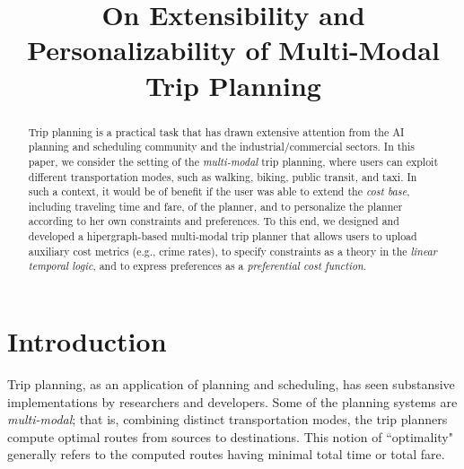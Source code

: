 \documentclass[letterpaper]{article}
\newcommand{\tit}[1]{\textit{#1}}
\begin{document}
%
\title{On Extensibility and Personalizability of Multi-Modal Trip Planning}
\maketitle
\begin{abstract}
	Trip planning is a practical task that has drawn
	extensive attention from the AI planning and scheduling community
	and the industrial/commercial sectors.
	In this paper, we consider the setting of the \tit{multi-modal}
	trip planning, where users can exploit different transportation
	modes, such as walking, biking, public transit, and taxi.
	In such a context, it would be of benefit if the
	user was able to extend the \tit{cost base}, including traveling time 
	and fare, of the planner, and to personalize the planner according
	to her own constraints and preferences.
	To this end, we designed and developed a hipergraph-based multi-modal
	trip planner that allows users to upload auxiliary cost metrics (e.g.,
	crime rates), to specify constraints as a theory in the 
	\tit{linear temporal logic}, and to express preferences as a 
	\tit{preferential cost function}.
\end{abstract}

\section{Introduction}
Trip planning, as an application of planning and scheduling,
has seen substansive implementations by researchers and
developers\cite{bast2015route}.
Some of the planning systems are \tit{multi-modal}; that is,
combining distinct transportation modes, the trip planners
compute optimal routes from sources to destinations.
This notion of ``optimality" generally refers to the computed routes
having minimal total time or total fare.
\end{document}
